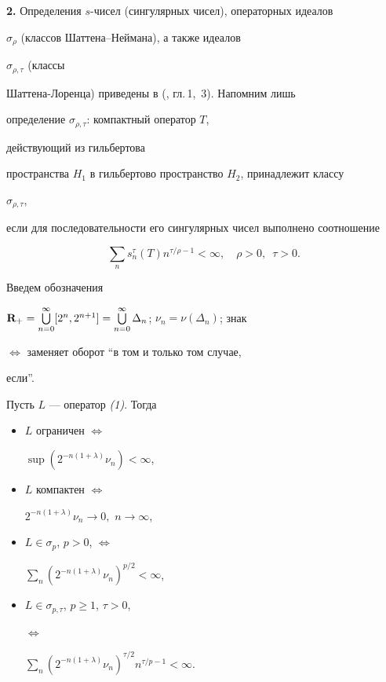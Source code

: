 {\bf 2.} Определения $s$-чисел (сингулярных чисел), операторных идеалов


$\sigma_\rho$ (классов Шаттена--Неймана), а также идеалов


$\sigma_{\rho,\tau}$ (классы


Шаттена-Лоренца) приведены в (\cite{3}, гл.\,1,~3). Напомним лишь


определение $\sigma_{\rho,\tau}$: компактный оператор $T$,


действующий из гильбертова


пространства $H_1$ в гильбертово пространство $H_2$, принадлежит классу


$\sigma_{\rho,\tau}$,


если для последовательности его сингулярных чисел выполнено соотношение


$$


\sum_n s^\tau_n(T)n^{\tau/\rho-1}<\infty,\quad \rho>0,\ \;\tau>0.


$$





Введем обозначения


$\bold R_+=\bigcup\limits^\infty_{n=0}[2^n,2^{n+1}]=


\bigcup\limits^\infty_{n=0}\Delta_n$; $\nu_n=\nu(\Delta_n)$; знак


$\Longleftrightarrow$ заменяет оборот ``в том и только том случае,


если''.





\begin{thm} Пусть $L$ --- оператор {\em (1)}. Тогда


\begin{itemize}


\item[а)] $L$ ограничен $\Longleftrightarrow$


$\sup(2^{-n(1+\lambda)}\nu_n)<\infty$,


\item[б)] $L$ компактен $\Longleftrightarrow$


$2^{-n(1+\lambda)}\nu_n\to 0,$ $n\to\infty$,


\item[в)] $L\in\sigma_p$, $p>0$, $\Longleftrightarrow$


$\sum\limits_n(2^{-n(1+\lambda)}\nu_n)^{p/2}<\infty$,


\item[г)] $L\in\sigma_{p,\tau}$, $p\ge 1$, $\tau>0$,


$\Longleftrightarrow$


$\sum\limits_n(2^{-n(1+\lambda)}\nu_n)^{\tau/2}


n^{\tau/p-1}<\infty$.


\end{itemize}


\end{thm}





